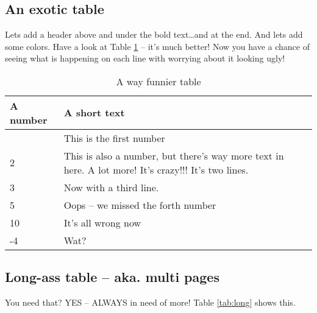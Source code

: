 \subsection{An exotic table}

Lets add a header above and under the bold text\dots and at the end.
And lets add some colors.
Have a look at Table \ref{tab:exotic} -- it's much better!
Now you have a chance of seeing what is happening on each line with worrying about it looking ugly!

\begin{table}[htbp]
	\centering
	\begin{tabularx}{\textwidth}{l X} \hline
	\hiderowcolors %
	\textbf{A number} & \textbf{A short text}  \\ \hline
	\showrowcolors %
	1 & This is the first number \\
	2 & This is also a number, but there's way more text in here. A lot more! It's crazy!!! It's two lines. \\
	3 & Now with a third line. \\
	5 & Oops -- we missed the forth number \\
	10 & It's all wrong now \\
	-4 & Wat? \\ \hline
	\end{tabularx}
	\caption{A way funnier table}
	\label{tab:exotic}
\end{table}

\newpage
\subsection{Long-ass table -- aka. multi pages}

You need that?
YES -- ALWAYS in need of more!
Table \ref{tab:long} shows this.

